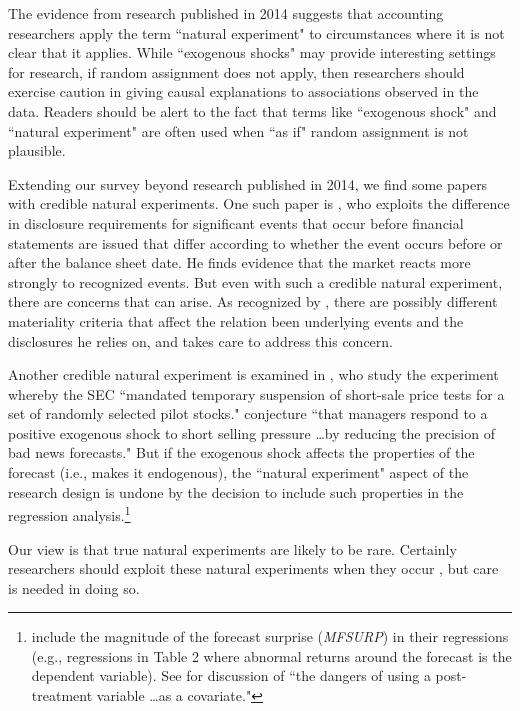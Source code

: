 \documentclass[11pt,reqno,titlepage]{amsart}
\begin{document}
\begin{doublespace}
The evidence from research published in 2014 suggests that accounting researchers apply the term ``natural experiment" to circumstances where it is not clear that it applies.
While ``exogenous shocks" may provide interesting settings for research, if random assignment does not apply, then researchers should exercise caution in giving causal explanations to associations observed in the data.
Readers should be alert to the fact that terms like ``exogenous shock" and ``natural experiment" are often used when ``as if" random assignment is not plausible.

Extending our survey beyond research published in 2014, we find some papers with credible natural experiments.
One such paper is \citet{Michels:2015aa}, who exploits the difference in disclosure requirements for significant events that occur before financial statements are issued that differ according to whether the event occurs before or after the balance sheet date.
He finds evidence that the market reacts more strongly to recognized events.
But even with such a credible natural experiment, there are concerns that can arise.
As recognized by \citet{Michels:2015aa}, there are possibly different materiality criteria that affect the relation been underlying events and the disclosures he relies on, and \citet{Michels:2015aa} takes care to address this concern.

Another credible natural experiment is examined in \citet[p.\,80]{Li:2015he}, who study the experiment whereby the SEC ``mandated temporary suspension of short-sale price tests for a set of randomly selected pilot stocks."
\citet[p.\,79]{Li:2015he} conjecture ``that managers respond to a positive exogenous shock to short selling pressure \dots by reducing the precision of bad news forecasts."
But if the exogenous shock affects the properties of the forecast (i.e., makes it endogenous), the ``natural experiment" aspect of the research design is undone by the decision to include such properties in the regression analysis.\footnote{\citet{Li:2015he} include the magnitude of the forecast surprise (\textit{MFSURP}) in their regressions (e.g., regressions in Table 2 where abnormal returns around the forecast is the dependent variable).
See \citet[p.\,116]{Imbens:2015aa} for discussion of ``the dangers of using a post-treatment variable \dots as a covariate."}

Our view is that true natural experiments are likely to be rare.
Certainly researchers should exploit these natural experiments when they occur \citep[e.g.][]{Michels:2015aa,Li:2015he}, but care is needed in doing so.


\end{doublespace}
\end{document}
